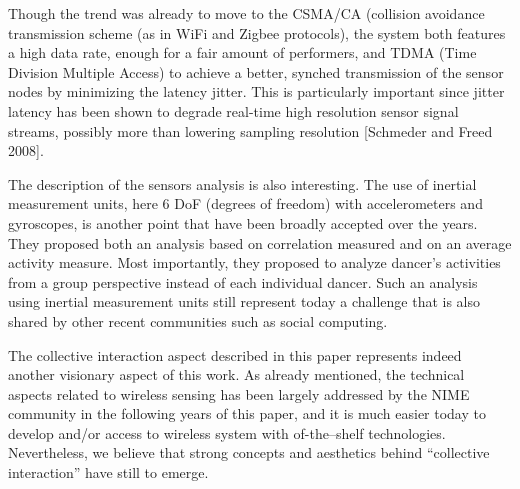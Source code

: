 Though the trend was already to move to the CSMA/CA (collision avoidance transmission scheme (as in WiFi and Zigbee protocols), the system both features a high data rate, enough for a fair amount of performers, and TDMA (Time Division Multiple Access) to achieve a better, synched transmission of the sensor nodes by minimizing the latency jitter. This is particularly important since jitter latency has been shown to degrade real-time high resolution sensor signal streams, possibly more than lowering sampling resolution [Schmeder and Freed 2008].

The description of the sensors analysis is also interesting. The use of inertial measurement units, here 6 DoF (degrees of freedom) with accelerometers and gyroscopes, is another point that have been broadly accepted over the years. They proposed both an analysis based on correlation measured and on an average activity measure. Most importantly, they proposed to analyze dancer's activities from a group perspective instead of each individual dancer. Such an analysis using inertial
measurement units still represent today a challenge that is also shared by other recent communities such as social computing.

The collective interaction aspect described in this paper represents indeed another visionary aspect of this work. As already mentioned, the technical aspects related to wireless sensing has been largely addressed by the NIME community in the following years of this paper, and it is much easier today to develop and/or access to wireless system with of-the–shelf technologies. Nevertheless, we believe that strong concepts and aesthetics behind ``collective interaction'' have still to emerge.

%
%

